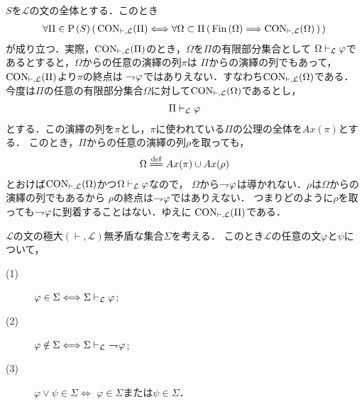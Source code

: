 	\begin{sketch}
		$S$を$\mathcal{L}$の文の全体とする．このとき
		\begin{align}
			\forall \Pi \in \operatorname*{P}\hspace{0.15em}(S)\, 
			(\, \operatorname{CON}_{\vdash,\mathcal{L}}(\Pi) \Longleftrightarrow 
			\forall \Omega \subset \Pi\, (\, \operatorname*{Fin}\hspace{0.15em}(\Omega) \Longrightarrow \operatorname{CON}_{\vdash,\mathcal{L}}(\Omega)\, )\, )
		\end{align}
		が成り立つ．実際，$\operatorname{CON}_{\vdash,\mathcal{L}}(\Pi)$のとき，$\Omega$を$\Pi$の有限部分集合として
		$\Omega \vdash_{{\scriptsize \mathcal{L}}} \varphi$であるとすると，$\Omega$からの任意の演繹の列$\pi$は
		$\Pi$からの演繹の列でもあって，$\operatorname{CON}_{\vdash,\mathcal{L}}(\Pi)$より$\pi$の終点は
		$\rightharpoondown\hspace{-0.25em} \varphi$ではありえない．すなわち$\operatorname{CON}_{\vdash,\mathcal{L}}(\Omega)$である．
		今度は$\Pi$の任意の有限部分集合$\Omega$に対して$\operatorname{CON}_{\vdash,\mathcal{L}}(\Omega)$であるとし，
		\begin{align}
			\Pi \vdash_{{\scriptsize \mathcal{L}}} \varphi
		\end{align}
		とする．この演繹の列を$\pi$とし，$\pi$に使われている$\Pi$の公理の全体を$Ax(\pi)$とする．
		このとき，$\Pi$からの任意の演繹の列$\rho$を取っても，
		\begin{align}
			\Omega \defeq Ax(\pi) \cup Ax(\rho)
		\end{align}
		とおけば$\operatorname{CON}_{\vdash,\mathcal{L}}(\Omega)$かつ$\Omega \vdash_{{\scriptsize \mathcal{L}}} \varphi$なので，
		$\Omega$から$\rightharpoondown\hspace{-0.25em} \varphi$は導かれない．$\rho$は$\Omega$からの演繹の列でもあるから
		$\rho$の終点は$\rightharpoondown\hspace{-0.25em} \varphi$ではありえない．
		つまりどのように$\rho$を取っても$\rightharpoondown\hspace{-0.25em} \varphi$に到着することはない．ゆえに
		$\operatorname{CON}_{\vdash,\mathcal{L}}(\Pi)$である．
	\end{sketch}
	
	\begin{screen}
		\begin{thm}[補題2.12.13]
			$\mathcal{L}$の文の極大$(\vdash,\mathcal{L})$無矛盾な集合$\Sigma$を考える．
			このとき$\mathcal{L}$の任意の文$\varphi$と$\psi$について，
			\begin{description}
				\item[(1)] $\varphi \in \Sigma \Longleftrightarrow 
					\Sigma \vdash_{{\scriptsize \mathcal{L}}} \varphi$;
				\item[(2)] $\varphi \notin \Sigma \Longleftrightarrow 
					\Sigma \vdash_{{\scriptsize \mathcal{L}}}\ \rightharpoondown\hspace{-0.25em} \varphi$;
				\item[(3)] $\varphi \vee \psi \in \Sigma \Longleftrightarrow$
					$\varphi \in \Sigma$または$\psi \in \Sigma$．
			\end{description}
		\end{thm}
	\end{screen}
	
